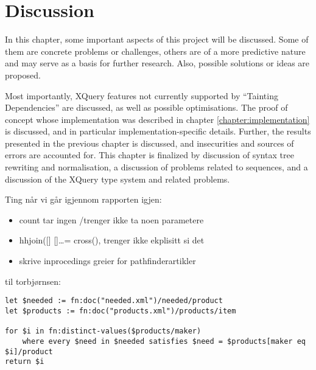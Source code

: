 \chapter{Discussion}
\label{chapter:discussion}
In this chapter, some important aspects of this project will be discussed. Some
of them are concrete problems or challenges, others are of a more predictive
nature and may serve as a basis for further research. Also, possible
solutions or ideas are proposed. 

Most importantly, XQuery features not
currently supported by ``Tainting Dependencies'' are discussed, as well as
possible optimisations. The proof of concept whose implementation was
described in chapter \ref{chapter:implementation} is discussed, and in
particular implementation-specific details. Further, the results presented in
the previous chapter is discussed, and insecurities and sources of errors are
accounted for. This chapter is finalized by discussion of syntax tree rewriting
and normalisation, a discussion of problems related to sequences, and a
discussion of the XQuery type system and related problems.

Ting n\aa r vi g\aa r igjennom rapporten igjen:
\begin{itemize}
  \item count tar ingen /trenger ikke ta noen parametere
  \item hhjoin([] []\ldots = cross(), trenger ikke ekplisitt si det
  \item skrive inprocedings greier for pathfinderartikler
\end{itemize}

til torbj\o rnsen:
\begin{verbatim}
let $needed := fn:doc("needed.xml")/needed/product
let $products := fn:doc("products.xml")/products/item

for $i in fn:distinct-values($products/maker) 
    where every $need in $needed satisfies $need = $products[maker eq $i]/product
return $i

\end{verbatim}








